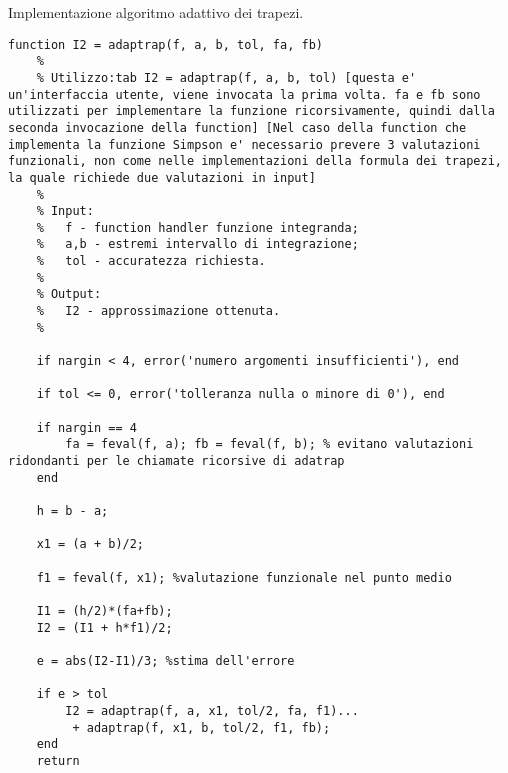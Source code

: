 \begin{algorithm}\caption{Implementazione algoritmo adattivo dei trapezi.}
\label{alg:formula_trapezi_adattiva}
    \begin{lstlisting}[style=Matlab-editor]
    function I2 = adaptrap(f, a, b, tol, fa, fb)
    %
    % Utilizzo:tab I2 = adaptrap(f, a, b, tol) [questa e' un'interfaccia utente, viene invocata la prima volta. fa e fb sono utilizzati per implementare la funzione ricorsivamente, quindi dalla seconda invocazione della function] [Nel caso della function che implementa la funzione Simpson e' necessario prevere 3 valutazioni funzionali, non come nelle implementazioni della formula dei trapezi, la quale richiede due valutazioni in input]
    %
    % Input:
    %   f - function handler funzione integranda;
    %   a,b - estremi intervallo di integrazione;
    %   tol - accuratezza richiesta.
    %
    % Output:
    %   I2 - approssimazione ottenuta.
    %
    
    if nargin < 4, error('numero argomenti insufficienti'), end
    
    if tol <= 0, error('tolleranza nulla o minore di 0'), end 
    
    if nargin == 4
        fa = feval(f, a); fb = feval(f, b); % evitano valutazioni ridondanti per le chiamate ricorsive di adatrap 
    end
    
    h = b - a;
    
    x1 = (a + b)/2;
    
    f1 = feval(f, x1); %valutazione funzionale nel punto medio
    
    I1 = (h/2)*(fa+fb); 
    I2 = (I1 + h*f1)/2; 
    
    e = abs(I2-I1)/3; %stima dell'errore
    
    if e > tol
        I2 = adaptrap(f, a, x1, tol/2, fa, f1)...
         + adaptrap(f, x1, b, tol/2, f1, fb); 
    end
    return
    \end{lstlisting}
\end{algorithm}

